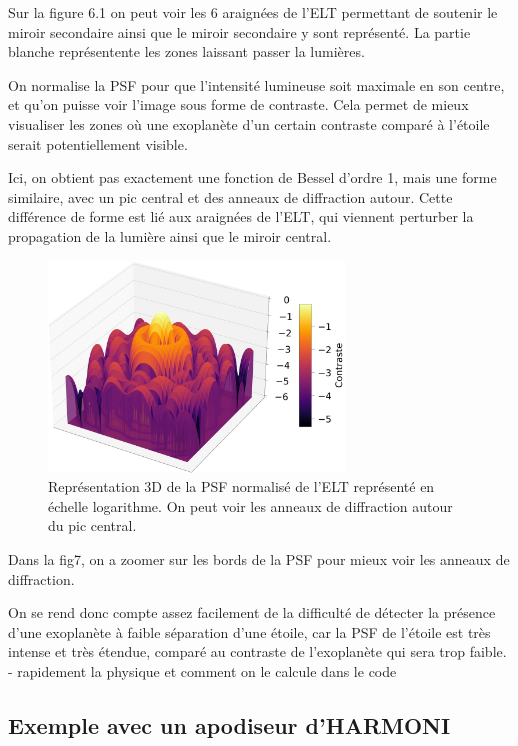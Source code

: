 Sur la figure 6.1 on peut voir les 6 araignées de l'ELT permettant de soutenir le miroir secondaire ainsi que le miroir secondaire y sont représenté. La partie blanche représentente les zones laissant passer la lumières.

On normalise la PSF pour que l'intensité lumineuse soit maximale en son centre, et qu'on puisse voir l'image sous forme de contraste. Cela permet de mieux visualiser les zones où une exoplanète d'un certain contraste comparé à l'étoile serait potentiellement visible.

Ici, on obtient pas exactement une fonction de Bessel d'ordre 1, mais une forme similaire, avec un pic central et des anneaux de diffraction autour. Cette différence de forme est lié aux araignées de l'ELT, qui viennent perturber la propagation de la lumière ainsi que le miroir central.



\begin{figure}[htbp]
    \centering
    \includegraphics[width=0.7\textwidth]{figures/PSF_ELT_3D_bord.png}
    \caption{Représentation 3D de la PSF normalisé de l'ELT représenté en échelle logarithme. On peut voir les anneaux de diffraction autour du pic central.}
\end{figure}

Dans la fig7, on a zoomer sur les bords de la PSF pour mieux voir les anneaux de diffraction.

On se rend donc compte assez facilement de la difficulté de détecter la présence d'une exoplanète à faible séparation d'une étoile, car la PSF de l'étoile est très intense et très étendue, comparé au contraste de l'exoplanète qui sera trop faible.
- rapidement la physique et comment on le calcule dans le code


\subsection{Exemple avec un apodiseur d'HARMONI}

